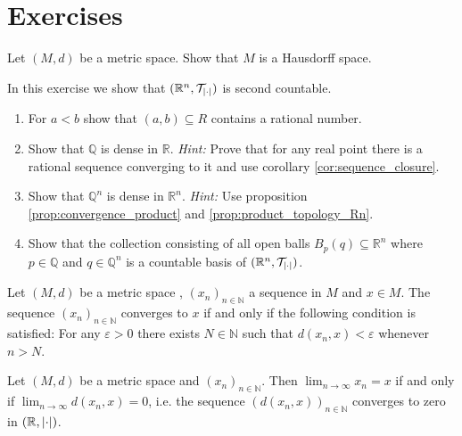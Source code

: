 \section*{Exercises}

\begin{exercise}
	Let $(M,d)$ be a metric space. Show that $M$ is a Hausdorff space.
\end{exercise}

\begin{exercise}
	In this exercise we show that $(\mathbb{R}^n,\mathcal{T}_{\abs[0]{\cdot}})$ is second countable.

	\begin{enumerate}[label = (\alph*)]
		\item For $a < b$ show that $(a,b) \subseteq R$ contains a rational number.
		\item Show that $\mathbb{Q}$ is dense in $\mathbb{R}$. \textit{Hint:} Prove that for any real point there is a rational sequence converging to it and use corollary \ref{cor:sequence_closure}.
		\item Show that $\mathbb{Q}^n$ is dense in $\mathbb{R}^n$. \textit{Hint:} Use proposition \ref{prop:convergence_product} and \ref{prop:product_topology_Rn}.
		\item Show that the collection consisting of all open balls $B_p(q) \subseteq \mathbb{R}^n$ where $p \in \mathbb{Q}$ and $q \in \mathbb{Q}^n$ is a countable basis of $(\mathbb{R}^n,\mathcal{T}_{\abs[0]{\cdot}})$. 
	\end{enumerate}
\end{exercise}

\begin{exercise}
	Let $(M,d)$ be a metric space , $(x_n)_{n \in \mathbb{N}}$ a sequence in $M$ and $x \in M$. The sequence $(x_n)_{n \in \mathbb{N}}$ converges to $x$ if and only if the following condition is satisfied: For any $\varepsilon > 0$ there exists $N \in \mathbb{N}$ such that $d(x_n,x) < \varepsilon$ whenever $n > N$.
	\label{ex:metric_convergence}
\end{exercise}

\begin{exercise}
	Let $(M,d)$ be a metric space and $(x_n)_{n \in \mathbb{N}}$. Then $\lim_{n \to \infty} x_n = x$ if and only if $\lim_{n \to \infty} d(x_n,x) = 0$, i.e. the sequence $(d(x_n,x))_{n \in \mathbb{N}}$ converges to zero in $(\mathbb{R},\abs[0]{\cdot})$.
	\label{ex:convergence_sequence}
\end{exercise}

